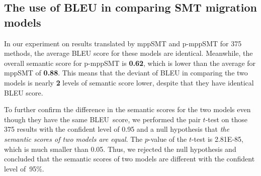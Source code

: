 \subsection{The use of BLEU in comparing SMT migration models}
In our experiment on results translated by mppSMT and p-mppSMT for 375
methods, the average BLEU score for these models are
identical. Meanwhile, the overall semantic score for p-mppSMT is
\textbf{0.62}, which is lower than the average for mppSMT of
\textbf{0.88}. This means that the deviant of BLEU in comparing the
two models is nearly \textbf{2} levels of semantic score lower,
despite that they have identical BLEU score.

To further confirm the difference in the semantic scores for the two
models even though they have the same BLEU~score, we performed the
pair $t$-test on those 375 results with the confident level of
0.95 and a null hypothesis that {\em the semantic scores of two models
  are equal}. The $p$-value of the $t$-test is 2.81E-85, which is much
smaller than 0.05. Thus, we rejected the null hypothesis and concluded
that the semantic scores of two models are different with the confident
level of~95\%.



%

